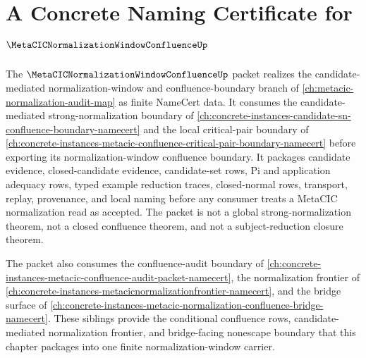 \chapter{A Concrete Naming Certificate for $\MetaCICNormalizationWindowConfluenceUp$}
\label{ch:concrete-instances-metacic-normalization-window-confluence-namecert}

The $\MetaCICNormalizationWindowConfluenceUp$ packet realizes the candidate-mediated normalization-window and confluence-boundary branch of \autoref{ch:metacic-normalization-audit-map} as finite NameCert data. It consumes the candidate-mediated strong-normalization boundary of \autoref{ch:concrete-instances-candidate-sn-confluence-boundary-namecert} and the local critical-pair boundary of \autoref{ch:concrete-instances-metacic-confluence-critical-pair-boundary-namecert} before exporting its normalization-window confluence boundary. It packages candidate evidence, closed-candidate evidence, candidate-set rows, Pi and application adequacy rows, typed example reduction traces, closed-normal rows, transport, replay, provenance, and local naming before any consumer treats a MetaCIC normalization read as accepted. The packet is not a global strong-normalization theorem, not a closed confluence theorem, and not a subject-reduction closure theorem.

The packet also consumes the confluence-audit boundary of \autoref{ch:concrete-instances-metacic-confluence-audit-packet-namecert}, the normalization frontier of \autoref{ch:concrete-instances-metacicnormalizationfrontier-namecert}, and the bridge surface of \autoref{ch:concrete-instances-metacic-normalization-confluence-bridge-namecert}. These siblings provide the conditional confluence rows, candidate-mediated normalization frontier, and bridge-facing nonescape boundary that this chapter packages into one finite normalization-window carrier.

